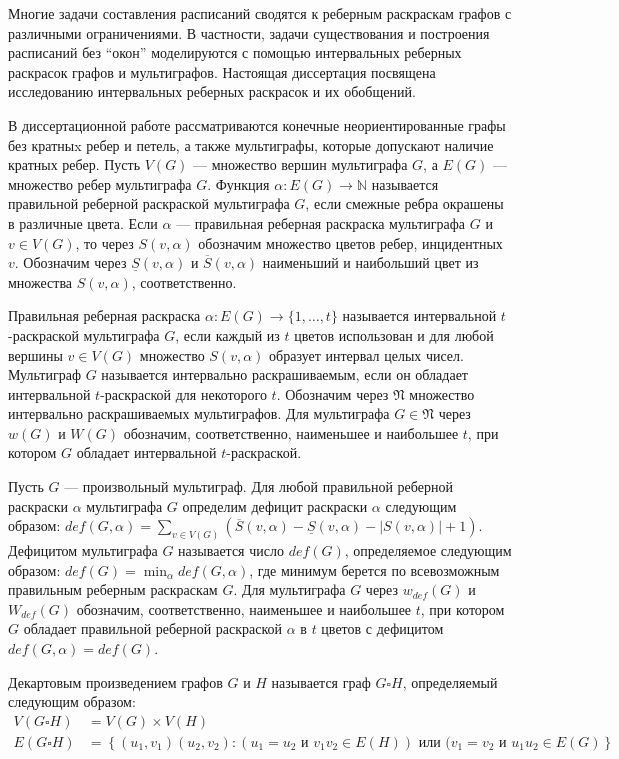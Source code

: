 Многие задачи составления расписаний сводятся к реберным раскраскам графов с различными ограничениями. В частности, задачи существования и построения расписаний без ``окон'' моделируются с помощью интервальных реберных раскрасок графов и мультиграфов. Настоящая диссертация посвящена исследованию интервальных реберных раскрасок и их обобщений.

В диссертационной работе рассматриваются конечные неориентированные графы без кратныx ребер и петель, а также мультиграфы, которые допускают наличие кратных ребер. Пусть $V(G)$ --- множество вершин мультиграфа $G$, а $E(G)$ --- множество ребер мультиграфа $G$. Функция $\alpha : E(G) \rightarrow \mathbb{N}$ называется правильной реберной раскраской мультиграфа $G$, если смежные ребра окрашены в различные цвета. Если $\alpha$ --- правильная реберная раскраска мультиграфа $G$ и $v\in V(G)$, то через $S(v,\alpha)$ обозначим множество цветов ребер, инцидентных $v$. Обозначим через $\underline{S}(v, \alpha)$ и $\overline{S}(v, \alpha)$ наименьший и наибольший цвет из множества $S(v,\alpha)$, соответственно.

Правильная реберная раскраска $\alpha : E(G) \rightarrow \{1,\ldots,t\}$ называется интервальной $t$-раскраской мультиграфа $G$, если каждый из $t$ цветов использован и для любой вершины $v\in V(G)$ множество $S(v,\alpha)$ образует интервал целых чисел. Мультиграф $G$ называется интервально раскрашиваемым, если он обладает интервальной $t$-раскраской для некоторого $t$. Обозначим через $\mathfrak{N}$ множество интервально раскрашиваемых мультиграфов. Для мультиграфа $G \in \mathfrak{N}$ через $w(G)$ и $W(G)$ обозначим, соответственно, наименьшее и наибольшее $t$, при котором $G$ обладает интервальной $t$-раскраской.

Пусть $G$ --- произвольный мультиграф. Для любой правильной реберной раскраски $\alpha$ мультиграфа $G$ определим дефицит раскраски  $\alpha$ следующим образом: $def(G, \alpha) = \sum\limits_{v\in V(G)}{\left(\overline{S}(v,\alpha)-\underline{S}(v,\alpha) - |S(v,\alpha)|+1\right)}$. Дефицитом мультиграфа $G$ называется число $def(G)$, определяемое следующим образом: $def(G) = \min_{\alpha}{def(G,\alpha)}$, где минимум берется по всевозможным правильным реберным раскраскам $G$. Для мультиграфа $G$ через $w_{def}(G)$ и $W_{def}(G)$ обозначим, соответственно, наименьшее и наибольшее $t$, при котором $G$ обладает правильной реберной раскраской $\alpha$ в $t$ цветов с дефицитом $def(G, \alpha) = def(G)$.

Декартовым произведением графов $G$ и $H$ называется граф $G \square H$, определяемый следующим образом:
\begin{align*}
V(G \square H) &= V(G) \times V(H) \\
E(G \square H) &= \left\{(u_1,v_1)(u_2,v_2) : (u_1=u_2 \text{ и } v_1v_2 \in E(H)) \text{ или } (v_1=v_2 \text{ и } u_1u_2 \in E(G) \right\}
\end{align*}

